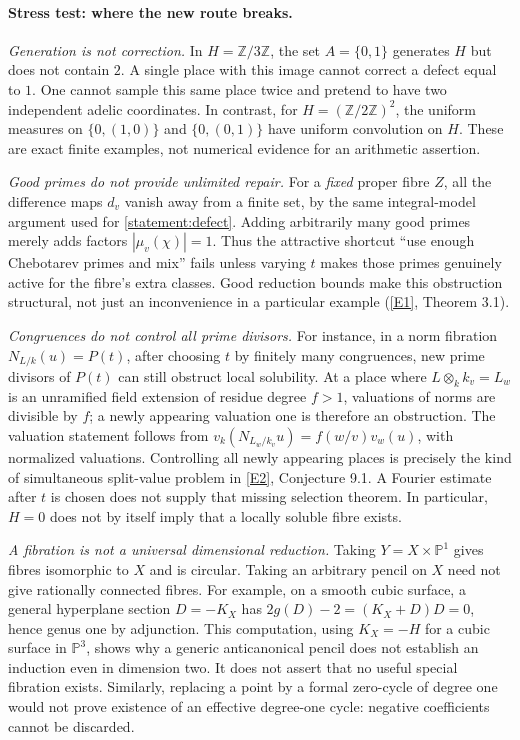 \documentclass[11pt]{article}
\newcommand{\Z}{\mathbb{Z}}
\newcommand{\PP}{\mathbb P}
\newcommand{\eref}[2]{\hyperlink{extra:#1:#2}{[E#2]}}
\begin{document}
\paragraph{Stress test: where the new route breaks.}
\emph{Generation is not correction.}  In $H=\Z/3\Z$, the set $A=\{0,1\}$
generates $H$ but does not contain $2$.  A single place with this image cannot
correct a defect equal to $1$.  One cannot sample this same place twice and
pretend to have two independent adelic coordinates.  In contrast, for
$H=(\Z/2\Z)^2$, the uniform measures on $\{0,(1,0)\}$ and $\{0,(0,1)\}$
have uniform convolution on $H$.  These are exact finite examples, not
numerical evidence for an arithmetic assertion.

\emph{Good primes do not provide unlimited repair.}  For a \emph{fixed}
proper fibre $Z$, all the difference maps $d_v$ vanish away from a finite set,
by the same integral-model argument used for \eqref{statement:defect}.  Adding
arbitrarily many good primes merely adds factors
$|\widehat\mu_v(\chi)|=1$.  Thus the attractive shortcut ``use enough
Chebotarev primes and mix'' fails unless varying $t$ makes those primes genuinely
active for the fibre's extra classes.  Good reduction bounds make this
obstruction structural, not just an inconvenience in a particular example
(\eref{statement}{1}, Theorem 3.1).

\emph{Congruences do not control all prime divisors.}  For instance, in a norm
fibration $N_{L/k}(u)=P(t)$, after choosing $t$ by finitely many congruences,
new prime divisors of $P(t)$ can still obstruct local solubility.  At a place
where $L\otimes_k k_v=L_w$ is an unramified field extension of residue
degree $f>1$, valuations of norms are divisible by $f$; a newly appearing valuation one is therefore an
obstruction.  The valuation statement follows from
$v_k(N_{L_w/k_v}u)=f(w/v)v_w(u)$, with normalized valuations.  Controlling
all newly appearing places is precisely the kind of simultaneous split-value
problem in \eref{statement}{2}, Conjecture 9.1.  A Fourier estimate after $t$ is
chosen does not supply that missing selection theorem.  In particular, $H=0$
does not by itself imply that a locally soluble fibre exists.

\emph{A fibration is not a universal dimensional reduction.}  Taking
$Y=X\times\PP^1$ gives fibres isomorphic to $X$ and is circular.  Taking an
arbitrary pencil on $X$ need not give rationally connected fibres.  For example,
on a smooth cubic surface, a general hyperplane section $D=-K_X$ has
$2g(D)-2=(K_X+D)D=0$, hence genus one by adjunction.  This computation, using $K_X=-H$ for a cubic surface in $\PP^3$, shows
why a generic anticanonical pencil does not establish an induction even in
dimension two.  It does not assert that no useful special fibration exists.
Similarly, replacing a point by a formal zero-cycle of degree one would not
prove existence of an effective degree-one cycle: negative coefficients cannot
be discarded.
\end{document}
